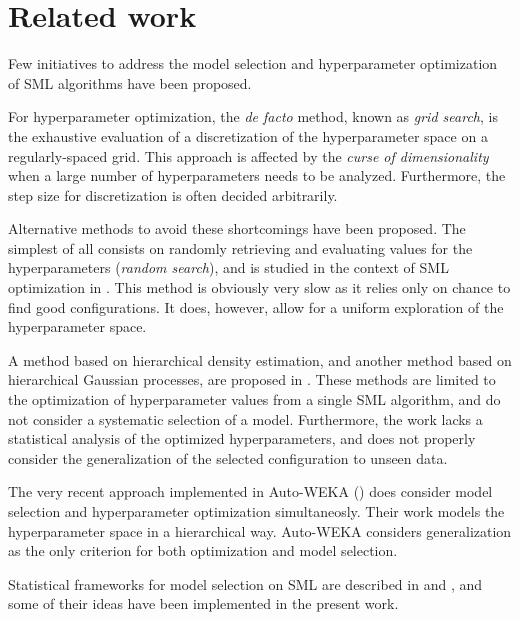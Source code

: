 	\section{Related work}

	Few initiatives to address the model selection and hyperparameter optimization of SML algorithms
	have been proposed. 

	For hyperparameter optimization, the \emph{de facto} method, known as \emph{grid search}, is the
	exhaustive evaluation of a discretization of the hyperparameter space on a regularly-spaced
	grid. This approach is
	affected by the \emph{curse of dimensionality} when a large number of hyperparameters needs to
	be analyzed. Furthermore, the step size for discretization is often decided arbitrarily.

	Alternative methods to avoid these shortcomings have been proposed. The simplest of all consists
	on randomly retrieving and evaluating values for the hyperparameters (\emph{random search}), and
	is studied in the context of SML optimization in \cite{bergstra2012random}. This method is
	obviously very slow as it relies only on chance to find good configurations. It does, however,
	allow for a uniform exploration of the hyperparameter space.

	A method based on hierarchical density estimation, and another method based on hierarchical
	Gaussian processes, are proposed in \cite{bergstra2011hyperparameter}. These methods are limited
	to the optimization of hyperparameter values from a single SML algorithm, and do not consider a
	systematic selection of a model. Furthermore, the work lacks a statistical analysis of the
	optimized hyperparameters, and does not properly consider the generalization of the selected configuration to
	unseen data.

	The very recent approach implemented in Auto-WEKA (\cite{autoweka}) does consider model selection and
	hyperparameter optimization simultaneosly. Their work models the hyperparameter space in a
	hierarchical way. Auto-WEKA considers generalization as the only criterion for both optimization and
	model selection.
	
	Statistical frameworks for model selection on SML are described in \cite{pizarro2002mct} and
	\cite{demsar2006mct}, and some of their ideas have been implemented in the present work.
